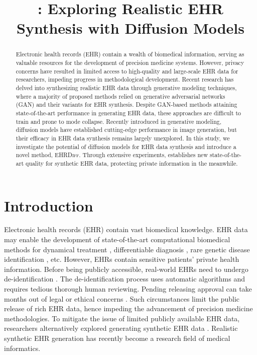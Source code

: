 \title{\modelname: Exploring Realistic EHR Synthesis with Diffusion Models}



\maketitle

\begin{abstract}
Electronic health records (EHR) contain a wealth of biomedical information, serving as valuable resources for the development of precision medicine systems. However, privacy concerns have resulted in limited access to high-quality and large-scale EHR data for researchers, impeding progress in methodological development. Recent research has delved into synthesizing realistic EHR data through generative modeling techniques, where a majority of proposed methods relied on generative adversarial networks (GAN) and their variants for EHR synthesis. Despite GAN-based methods attaining state-of-the-art performance in generating EHR data, these approaches are difficult to train and prone to mode collapse. Recently introduced in generative modeling, diffusion models have established cutting-edge performance in image generation, but their efficacy in EHR data synthesis remains largely unexplored. In this study, we investigate the potential of diffusion models for EHR data synthesis and introduce a novel method, \textsc{EHRDiff}. Through extensive experiments, \modelname establishes new state-of-the-art quality for synthetic EHR data, protecting private information in the meanwhile.
\end{abstract}

\section{Introduction}
Electronic health records (EHR) contain vast biomedical knowledge. 
EHR data may enable the development of state-of-the-art computational biomedical methods for dynamical treatment \citep{ASW2020expertsupervised}, differentiable diagnosis \citep{adpautodiag}, rare genetic disease identification \citep{Alsentzer2022.12.07.22283238}, etc. 
However, EHRs contain sensitive patients' private health information. Before being publicly accessible, real-world EHRs need to undergo de-identification \citep{Johnson2016MIMICIIIAF,Johnson2023MIMICIVAF}. 
The de-identification process uses automatic algorithms and requires tedious thorough human reviewing. Pending releasing approval can take months out of legal or ethical concerns \citep{10.1001/jama.282.15.1466}. 
Such circumstances limit the public release of rich EHR data, hence impeding the advancement of precision medicine methodologies. 
To mitigate the issue of limited publicly available EHR data, researchers alternatively explored generating synthetic EHR data \citep{pmlr-v68-choi17a,synthea}. 
Realistic synthetic EHR generation has recently become a research field of medical informatics. 


